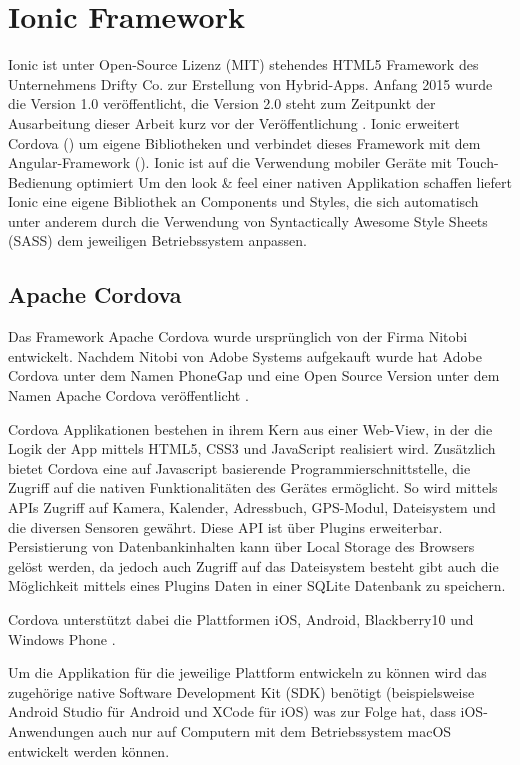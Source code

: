 \chapter{Ionic Framework}
\label{cha:ionic}
%
Ionic ist unter Open-Source Lizenz (MIT) stehendes HTML5 Framework des Unternehmens Drifty Co. zur Erstellung von Hybrid-Apps. Anfang 2015 wurde die Version 1.0 veröffentlicht, die Version 2.0 steht zum Zeitpunkt der Ausarbeitung dieser Arbeit kurz vor der Veröffentlichung \cite{ionic2Anounce}.
Ionic erweitert Cordova () um eigene Bibliotheken und verbindet dieses Framework mit dem Angular-Framework (). Ionic ist auf die Verwendung mobiler Geräte mit Touch-Bedienung optimiert Um den look \& feel einer nativen Applikation schaffen liefert Ionic eine eigene Bibliothek an Components und Styles, die sich automatisch unter anderem  durch die Verwendung von Syntactically Awesome Style Sheets (SASS) dem jeweiligen Betriebssystem anpassen.
%
%
\section{Apache Cordova}
\label{sec:ApacheCordova}
%
Das Framework Apache Cordova wurde ursprünglich von der Firma Nitobi entwickelt. Nachdem Nitobi von Adobe Systems aufgekauft wurde hat Adobe Cordova unter dem Namen PhoneGap und eine Open Source Version unter dem Namen Apache Cordova veröffentlicht \cite{adobePhoneGap}.

Cordova Applikationen bestehen in ihrem Kern aus einer Web-View, in der die Logik der App mittels HTML5, CSS3 und JavaScript realisiert wird. 
Zusätzlich bietet Cordova eine auf Javascript basierende Programmierschnittstelle, die Zugriff auf die nativen Funktionalitäten des Gerätes ermöglicht. So wird mittels APIs Zugriff auf Kamera, Kalender, Adressbuch, GPS-Modul, Dateisystem und die diversen Sensoren gewährt. Diese API ist über Plugins erweiterbar. Persistierung von Datenbankinhalten kann über Local Storage des Browsers gelöst werden, da jedoch auch Zugriff auf das Dateisystem besteht gibt auch die Möglichkeit mittels eines Plugins Daten in einer SQLite Datenbank zu speichern.

Cordova unterstützt dabei die Plattformen iOS, Android, Blackberry10 und Windows Phone \cite{cordovaSupportedPlatforms}.

Um die Applikation für die jeweilige Plattform entwickeln zu können wird das zugehörige native Software Development Kit (SDK) benötigt (beispielsweise Android Studio für Android und XCode für iOS) was zur Folge hat, dass iOS-Anwendungen auch nur auf Computern mit dem Betriebssystem macOS entwickelt werden können.

